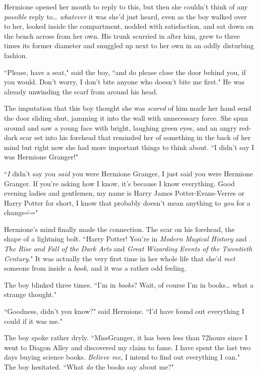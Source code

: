 Hermione opened her mouth to reply to this, but then she couldn't think of any \emph{possible} reply to{\ldots} \emph{whatever} it was she'd just heard, even as the boy walked over to her, looked inside the compartment, nodded with satisfaction, and sat down on the bench across from her own. His trunk scurried in after him, grew to three times its former diameter and snuggled up next to her own in an oddly disturbing fashion.

``Please, have a seat," said the boy, ``and do please close the door behind you, if you would. Don't worry, I don't bite anyone who doesn't bite me first." He was already unwinding the scarf from around his head.

The imputation that this boy thought she was \emph{scared} of him made her hand send the door sliding shut, jamming it into the wall with unnecessary force. She spun around and saw a young face with bright, laughing green eyes, and an angry red-dark scar set into his forehead that reminded her of something in the back of her mind but right now she had more important things to think about. ``I didn't say I was Hermione Granger!"

``\emph{I} didn't say you \emph{said} you were Hermione Granger, I just said you were Hermione Granger. If you're asking how I know, it's because I know everything. Good evening ladies and gentlemen, my name is Harry James Potter-Evans-Verres or Harry Potter for short, I know that probably doesn't mean anything to \emph{you} for a change\==="

Hermione's mind finally made the connection. The scar on his forehead, the shape of a lightning bolt. ``Harry Potter! You're in \emph{Modern Magical History} and \emph{The Rise and Fall of the Dark Arts} and \emph{Great Wizarding Events of the Twentieth Century}." It was actually the very first time in her whole life that she'd \emph{met} someone from inside a \emph{book}, and it was a rather odd feeling.

The boy blinked three times. ``I'm in \emph{books}? Wait, of course I'm in books{\ldots} what a strange thought."

``Goodness, didn't you know?" said Hermione. ``I'd have found out everything I could if it was me."

The boy spoke rather dryly. ``Miss\?Granger, it has been less than 72\?hours since I went to Diagon Alley and discovered my claim to fame. I have spent the last two days buying science books. \emph{Believe me}, I intend to find out everything I can." The boy hesitated. ``What \emph{do} the books say about me?"

